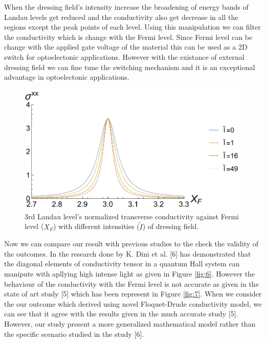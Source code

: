 \documentclass[a4paper]{article}
\numberwithin{equation}{subsection}
\numberwithin{equation}{section}
\begin{document}
When the dressing field's intensity increase the broadening of energy bands of Landau levels get reduced and the conductivity also get decrease in all the regions except the peak points of each level. Using this manipulation we can filter the conductivity which is change with the Fermi level. Since Fermi level can be change with the applied gate voltage of the material this can be used as a 2D switch for optoelectonic applications. However with the existance of  external dressing field we can fine tune the switching mechanism and it is an exceptional advantage in optoelectonic applications.

\begin{figure}[ht!]
  \centering
  \includegraphics[scale=0.9]{figures/fig5.pdf}
  \caption{$3$rd Landau level's normalized transverse conductivity against Fermi level ($X_F$) with different intensities ($\tilde{I}$) of dressing field.}
  \label{fig:5}
\end{figure}

Now we can compare our result with previous studies to the check the validity of the outcomes. In the research done by K. Dini et al. [6] has demonstrated that the diagonal elements of conductivity tensor in a quantum Hall system can manipute with apllying high intense light as given in Figure \ref{fig:6}. However the behaviour of the conductivity with the Fermi level is not accurate as given in the state of art study [5] which has been represent in Figure \ref{fig:7}. When we consider the our outcome which derived using novel Floquet-Drude conductivity model, we can see that it agree with the results given in the much accurate study [5]. However, our study present a more generalized mathematical model rather than the specific scenario studied in the study [6].
\end{document}
